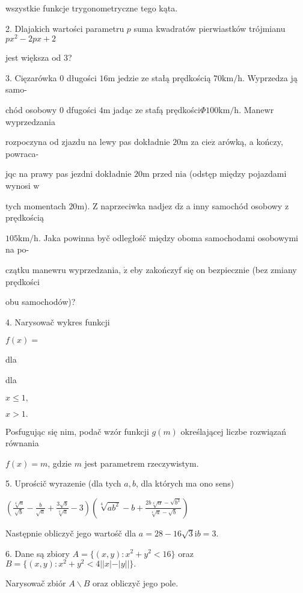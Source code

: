 \documentclass[a4paper,12pt]{article}
\begin{document}
wszystkie funkcje trygonometryczne tego kąta.

2. Dlajakich wartości parametru $p$ suma kwadratów pierwiastków trójmianu $px^{2}-2px+2$

jest większa od 3?

3. Cięzarówka $0$ długości $16\mathrm{m}$ jedzie ze stałą prędkością $70\mathrm{k}\mathrm{m}/\mathrm{h}$. Wyprzedza ją samo-

chód osobowy $0$ dfugości $4\mathrm{m}$ jadąc ze stafą prędkości$\Phi 100\mathrm{k}\mathrm{m}/\mathrm{h}$. Manewr wyprzedzania

rozpoczyna od zjazdu na lewy pas dokładnie $20\mathrm{m}$ za $\mathrm{c}\mathrm{i}\mathrm{e}\dot{\mathrm{z}}$ arówką, a kończy, powraca-

jqc na prawy pas jezdni dokładnie $20\mathrm{m}$ przed $\mathrm{n}\mathrm{i}\mathrm{a}$ (odstęp między pojazdami wynosi $\mathrm{w}$

tych momentach $20\mathrm{m}$). $\mathrm{Z}$ naprzeciwka nadjez $\mathrm{d}\dot{\mathrm{z}}$ a inny samochód osobowy $\mathrm{z}$ prędkością

$105\mathrm{k}\mathrm{m}/\mathrm{h}$. Jaka powinna byč odległośč między oboma samochodami osobowymi na po-

czątku manewru wyprzedzania, $\dot{\mathrm{z}}$ eby zakończyf się on bezpiecznie (bez zmiany prędkości

obu samochodów)?

4. Narysowač wykres funkcji

$f(x)=$

dla

dla

$x\leq 1,$

$x>1.$

Posfugując się nim, podač wzór funkcji $g(m)$ określającej liczbe rozwiązań równania

$f(x)=m$, gdzie $m$ jest parametrem rzeczywistym.

5. Uprościč wyrazenie (dla tych $a, b$, dla których ma ono sens)

$(\displaystyle \frac{\sqrt[4]{a}}{\sqrt{b}}-\frac{b}{\sqrt{a}}+\frac{3\sqrt{b}}{\sqrt[4]{a}}-3)(\sqrt[4]{ab^{2}}-b+\frac{2b\sqrt[4]{\alpha}-\sqrt{b^{3}}}{\sqrt[4]{a}-\sqrt{b}})$

Następnie obliczyč jego wartośč dla $a=28-16\sqrt{3}\mathrm{i}b=3.$

6. Dane są zbiory $A=\{(x,y):x^{2}+y^{2}<16\}$ oraz $B=\{(x,y):x^{2}+y^{2}<4||x|-|y||\}.$

Narysowač zbiór $A\backslash B$ oraz obliczyč jego pole.
\end{document}
